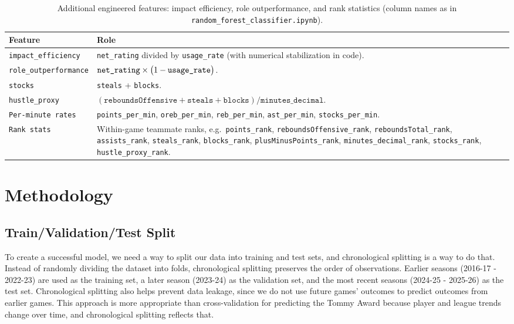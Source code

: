 \documentclass[11pt]{article}
\begin{document}
\begin{table}[htbp]
  \centering
  \caption{Additional engineered features: impact efficiency, role outperformance, and rank statistics (column names as in \texttt{random\_forest\_classifier.ipynb}).}
  \label{tab:engineered}
  \small
  \begin{tabular}{@{}lp{8.8cm}@{}}
    \toprule
    \textbf{Feature} & \textbf{Role} \\
    \midrule
    \texttt{impact\_efficiency} & \texttt{net\_rating} divided by \texttt{usage\_rate} (with numerical stabilization in code). \\
    \texttt{role\_outperformance} & $\text{\texttt{net\_rating}} \times \bigl(1 - \text{\texttt{usage\_rate}}\bigr)$. \\
    \texttt{stocks} & \texttt{steals} + \texttt{blocks}. \\
    \texttt{hustle\_proxy} & $(\texttt{reboundsOffensive} + \texttt{steals} + \texttt{blocks}) / \texttt{minutes\_decimal}$. \\
    \texttt{Per-minute rates} & \texttt{points\_per\_min}, \texttt{oreb\_per\_min}, \texttt{reb\_per\_min}, \texttt{ast\_per\_min}, \texttt{stocks\_per\_min}. \\
    \texttt{Rank stats} & Within-game teammate ranks, e.g.\ \texttt{points\_rank}, \texttt{reboundsOffensive\_rank}, \texttt{reboundsTotal\_rank}, \texttt{assists\_rank}, \texttt{steals\_rank}, \texttt{blocks\_rank}, \texttt{plusMinusPoints\_rank}, \texttt{minutes\_decimal\_rank}, \texttt{stocks\_rank}, \texttt{hustle\_proxy\_rank}. \\
    \bottomrule
  \end{tabular}
\end{table}

\section{Methodology}

\subsection{Train/Validation/Test Split}
To create a successful model, we need a way to split our data into training and test sets, and chronological splitting is a way to do that. Instead of randomly dividing the dataset into folds, chronological splitting preserves the order of observations. Earlier seasons (2016-17 - 2022-23) are used as the training set, a later season (2023-24) as the validation set, and the most recent seasons (2024-25 - 2025-26) as the test set. Chronological splitting also helps prevent data leakage, since we do not use future games' outcomes to predict outcomes from earlier games. This approach is more appropriate than cross-validation for predicting the Tommy Award because player and league trends change over time, and chronological splitting reflects that.
\end{document}
